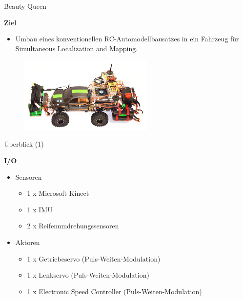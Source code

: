 \documentclass{beamer}
\begin{document}
\begin{frame}{Beauty Queen}
\begin{large}\textbf{Ziel}\end{large}
\begin{itemize}
	\item Umbau eines konventionellen RC-Automodellbausatzes in ein Fahrzeug f\"ur Simultaneous Localization and Mapping.
\end{itemize}
 \begin{figure}[H]
  \centering
  \includegraphics[width=0.6\textwidth]{./images/robot-beauty-queen.jpg}
 \end{figure}
\end{frame}
\begin{frame}{\"Uberblick (1)}
\begin{large}\textbf{I/O}\end{large}
\begin{itemize}
	\item Sensoren
	\begin{itemize}
		\item 1 x Microsoft Kinect
		\item 1 x IMU
		\item 2 x Reifenumdrehungssensoren
	\end{itemize}
	\item Aktoren
	\begin{itemize}
		\item 1 x Getriebeservo (Puls-Weiten-Modulation)
		\item 1 x Lenkservo (Puls-Weiten-Modulation)
		\item 1 x Electronic Speed Controller (Puls-Weiten-Modulation)
	\end{itemize}
\end{itemize}	
\end{frame}
\end{document}
